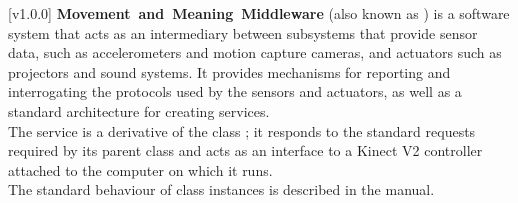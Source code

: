 [v1.0.0]
\textbf{Movement~and~Meaning~Middleware} (also known as \mplusm{}) is a software system
that acts as an intermediary between subsystems that provide sensor data, such as
accelerometers and motion capture cameras, and actuators such as projectors and sound
systems.
It provides mechanisms for reporting and interrogating the protocols used by the sensors
and actuators, as well as a standard architecture for creating services.\\

The \KVtwoI{} service is a derivative of the \mplusm{} class ;
it responds to the standard requests required by its parent class and acts as an interface
to a Kinect V2 controller attached to the computer on which it runs.\\

The standard behaviour of  class instances is described in
the \emph{\MMM} manual.
\primaryEnd{}

